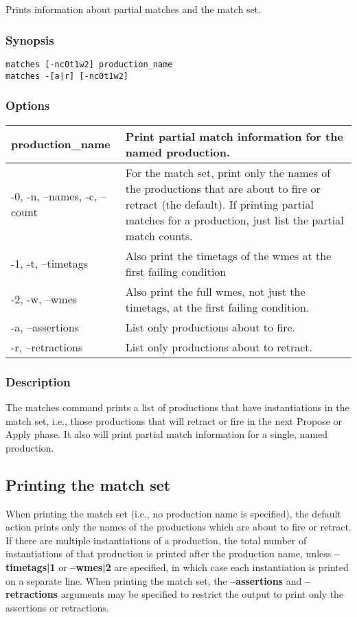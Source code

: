 \subsection{}
\label{matches}
Prints information about partial matches and the match set. 
\subsubsection*{Synopsis}
\begin{verbatim}
matches [-nc0t1w2] production_name
matches -[a|r] [-nc0t1w2]
\end{verbatim}
\subsubsection*{Options}
\begin{tabular}{|l|l|}
\hline 
production\_name & Print partial match information for the named production.  \\
 \hline 
 -0, -n, --names, -c, --count  & For the match set, print only the names of the productions that are about to fire or retract (the default). If printing partial matches for a production, just list the partial match counts.  \\
 \hline 
 -1, -t, --timetags  & Also print the timetags of the wmes at the first failing condition  \\
 \hline 
 -2, -w, --wmes  & Also print the full wmes, not just the timetags, at the first failing condition.  \\
 \hline 
 -a, --assertions  & List only productions about to fire.  \\
 \hline 
 -r, --retractions  & List only productions about to retract.  \\
 \hline 
\end{tabular}
\subsubsection*{Description}
 The matches command prints a list of productions that have instantiations in the match set, i.e., those productions that will retract or fire in the next Propose or Apply phase. It also will print partial match information for a single, named production. 
\subsection*{Printing the match set}
 When printing the match set (i.e., no production name is specified), the default action prints only the names of the productions which are about to fire or retract. If there are multiple instantiations of a production, the total number of instantiations of that production is printed after the production name, unless \textbf{--timetags|1}
 or \textbf{--wmes|2}
 are specified, in which case each instantiation is printed on a separate line. 
 When printing the match set, the \textbf{--assertions}
 and \textbf{--retractions}
 arguments may be specified to restrict the output to print only the assertions or retractions. 
